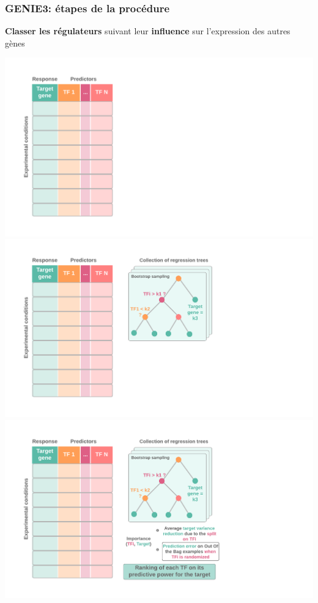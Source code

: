 \begin{frame}
    \frametitle{GENIE3: étapes de la procédure}
    \small \textbf{Classer les régulateurs} suivant leur \textbf{influence} sur l'expression des autres gènes
    \vspace{-0.2cm}
    \begin{center}
        \begin{overprint}
        \includegraphics[scale = 0.38]{Figures/Regression/rf1.png}
        \includegraphics[scale = 0.38]{Figures/Regression/rf2.png}
        \includegraphics[scale = 0.38]{Figures/Regression/rf3.png}

\end{overprint}
\end{center}
\end{frame}
